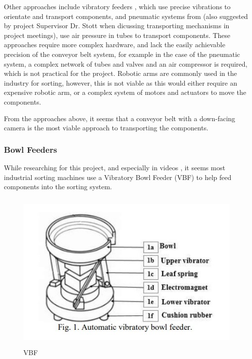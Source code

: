Other approaches include vibratory feeders \cite{s21217280}, which use precise vibrations to orientate and transport components, and pneumatic systems from \citet{ASEC2023-16267} (also suggested by project Supervisor Dr. Stott when dicussing transporting mechanisms in project meetings), use air pressure in tubes to transport components. These approaches require more complex hardware, and lack the easily achievable precision of the conveyor belt system, for example in the case of the pneumatic system, a complex network of tubes and valves and an air compressor is required, which is not practical for the project. Robotic arms are commonly used in the industry for sorting, however, this is not viable as this would either require an expensive robotic arm, or a complex system of motors and actuators to move the components.

From the approaches above, it seems that a conveyor belt with a down-facing camera is the most viable approach to transporting the components.


\subsubsection{Bowl Feeders}
While researching for this project, and especially in videos \cite{videobowlfeeder}, it seems most industrial sorting machines use a Vibratory Bowl Feeder (VBF) to help feed components into the sorting system.

\begin{figure}[H]
  \hfill
  \begin{minipage}[t]{\textwidth}
    \centering
    \includegraphics[height=8cm]{imgs/articles/feeder.jpg}
    \caption{VBF \cite{nam2019design}}
    \label{fig:feeder}
  \end{minipage}
\end{figure}

